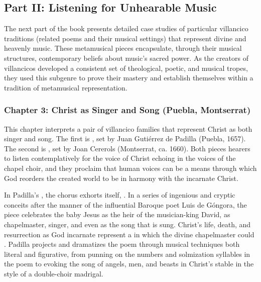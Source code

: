 \documentclass{vcbook-proposal}
\begin{document}
\subsection{Part II: Listening for Unhearable Music}

The next part of the book presents detailed case studies of particular 
villancico traditions (related poems and their musical settings) that represent 
divine and heavenly music.
These metamusical pieces encapsulate, through their musical structures, 
contemporary beliefs about music's sacred power.
As the creators of villancicos developed a consistent set of theological, 
poetic, and musical tropes, they used this subgenre to prove their mastery and 
establish themselves within a tradition of metamusical representation.

\subsubsection{Chapter 3: Christ as Singer and Song (Puebla, Montserrat)}

This chapter interprets a pair of villancico families that represent Christ as
both singer and song.
The first is , set by Juan Gutiérrez de
Padilla (Puebla, 1657).
The second is , set by Joan 
Cererols (Montserrat, ca. 1660).
Both pieces hearers to listen contemplatively for the voice of Christ echoing 
in the voices of the chapel choir, and they proclaim that human voices can be a 
means through which God reorders the created world to be in harmony with the 
incarnate Christ.

In Padilla's , the chorus exhorts itself, .
In a series of ingenious and cryptic conceits after the manner of the
influential Baroque poet Luis de Góngora, the piece celebrates the baby Jesus as
the heir of the musician-king David, as chapelmaster, singer, and even as the
song that is sung.
Christ's life, death, and resurrection as God incarnate represent a 
 in which the divine chapelmaster could .
Padilla projects and dramatizes the poem through musical techniques both literal
and figurative, from punning on the numbers and solmization syllables in the
poem to evoking the song of angels, men, and beasts in Christ's stable in the
style of a double-choir madrigal.
\end{document}
